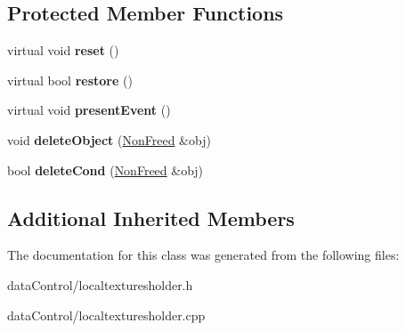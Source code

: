 \subsection*{Protected Member Functions}
\begin{DoxyCompactItemize}
\item 
\hypertarget{class_tempest_1_1_local_textures_holder_a52a1993c3afedeae802697f8d8909ba9}{virtual void {\bfseries reset} ()}\label{class_tempest_1_1_local_textures_holder_a52a1993c3afedeae802697f8d8909ba9}

\item 
\hypertarget{class_tempest_1_1_local_textures_holder_aa9a66f0ca50b65cf509b430ff052ab12}{virtual bool {\bfseries restore} ()}\label{class_tempest_1_1_local_textures_holder_aa9a66f0ca50b65cf509b430ff052ab12}

\item 
\hypertarget{class_tempest_1_1_local_textures_holder_a22ed5322cf5b838aef08c3996ae95c15}{virtual void {\bfseries present\+Event} ()}\label{class_tempest_1_1_local_textures_holder_a22ed5322cf5b838aef08c3996ae95c15}

\item 
\hypertarget{class_tempest_1_1_local_textures_holder_aa03edbbd9b43bfab2318086bcddbf41d}{void {\bfseries delete\+Object} (\hyperlink{struct_tempest_1_1_local_textures_holder_1_1_non_freed}{Non\+Freed} \&obj)}\label{class_tempest_1_1_local_textures_holder_aa03edbbd9b43bfab2318086bcddbf41d}

\item 
\hypertarget{class_tempest_1_1_local_textures_holder_a286caab38bc6ddb5f33984876392c8b6}{bool {\bfseries delete\+Cond} (\hyperlink{struct_tempest_1_1_local_textures_holder_1_1_non_freed}{Non\+Freed} \&obj)}\label{class_tempest_1_1_local_textures_holder_a286caab38bc6ddb5f33984876392c8b6}

\end{DoxyCompactItemize}
\subsection*{Additional Inherited Members}


The documentation for this class was generated from the following files\+:\begin{DoxyCompactItemize}
\item 
data\+Control/localtexturesholder.\+h\item 
data\+Control/localtexturesholder.\+cpp\end{DoxyCompactItemize}
